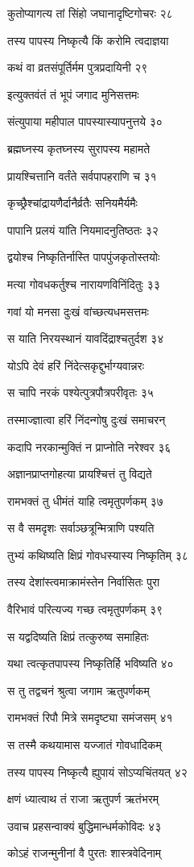 कुतोप्यागत्य तां सिंहो जघानादृष्टिगोचरः २८

तस्य पापस्य निष्कृत्यै किं करोमि त्वदाज्ञया

कथं वा व्रतसंपूर्तिर्मम पुत्रप्रदायिनी २९

इत्युक्तवंतं तं भूपं जगाद मुनिसत्तमः

संत्युपाया महीपाल पापस्यास्यापनुत्तये ३०

ब्रह्मघ्नस्य कृतघ्नस्य सुरापस्य महामते

प्रायश्चित्तानि वर्तंते सर्वपापहराणि च ३१

कृच्छ्रैश्चांद्रायणैर्दानैर्व्रतैः सनियमैर्यमैः

पापानि प्रलयं यांति नियमादनुतिष्ठतः ३२

द्वयोश्च निष्कृतिर्नास्ति पापपुंजकृतोस्तयोः

मत्या गोवधकर्तुश्च नारायणविनिंदितुः ३३

गवां यो मनसा दुःखं वांच्छत्यधमसत्तमः

स याति निरयस्थानं यावदिंद्राश्चतुर्दश ३४

योऽपि देवं हरिं निंदेत्सकृद्दुर्भाग्यवान्नरः

स चापि नरकं पश्येत्पुत्रपौत्रपरीवृतः ३५

तस्माज्ज्ञात्वा हरिं निंदन्गोषु दुःखं समाचरन्

कदापि नरकान्मुक्तिं न प्राप्नोति नरेश्वर ३६

अज्ञानप्राप्तगोहत्या प्रायश्चित्तं तु विद्यते

रामभक्तं तु धीमंतं याहि त्वमृतुपर्णकम् ३७

स वै समदृशः सर्वाञ्छत्रून्मित्राणि पश्यति

तुभ्यं कथिष्यति क्षिप्रं गोवधस्यास्य निष्कृतिम् ३८

तस्य देशांस्त्वमाक्रामंस्तेन निर्वासितः पुरा

वैरिभावं परित्यज्य गच्छ त्वमृतुपर्णकम् ३९

स यद्वदिष्यति क्षिप्रं तत्कुरुष्व समाहितः

यथा त्वत्कृतपापस्य निष्कृतिर्हि भविष्यति ४०

स तु तद्वचनं श्रुत्वा जगाम ऋतुपर्णकम्

रामभक्तं रिपौ मित्रे समदृष्ट्या समंजसम् ४१

स तस्मै कथयामास यज्जातं गोवधादिकम्

तस्य पापस्य निष्कृत्यै ह्युपायं सोऽप्यचिंतयत् ४२

क्षणं ध्यात्वाथ तं राजा ऋतुपर्ण ऋतंभरम्

उवाच प्रहसन्वाक्यं बुद्धिमान्धर्मकोविदः ४३

कोऽहं राजन्मुनीनां वै पुरतः शास्त्रवेदिनाम्

